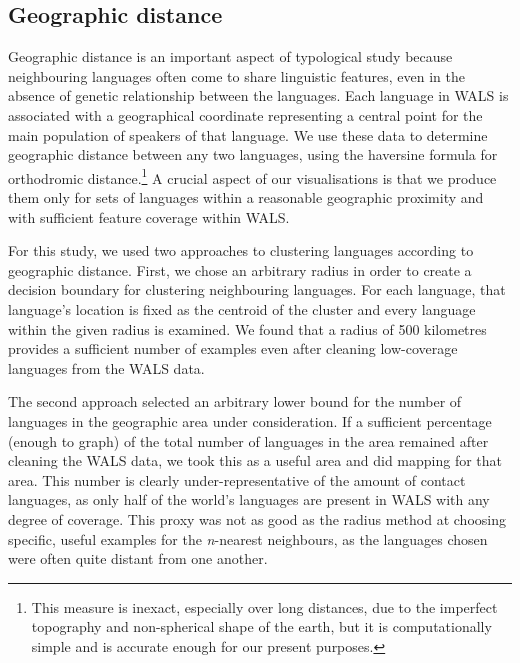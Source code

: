 \documentclass[11pt]{article}
\begin{document}
\subsection{Geographic distance}
Geographic distance is an important aspect of typological study because neighbouring  languages often come to share linguistic features, even in the absence of genetic relationship between the languages. Each language in WALS is associated with a geographical coordinate representing a central point for the main population of speakers of that language. We use these data to determine geographic distance between any two languages, using the haversine formula for orthodromic distance.\footnote{This measure is inexact, especially over long distances, due to the imperfect topography and non-spherical shape of the earth, but it is computationally simple and is accurate enough for our present purposes.}
A crucial aspect of our visualisations is that we produce them only for sets of languages within a reasonable geographic proximity and with sufficient feature coverage within WALS.

For this study, we used two approaches to clustering languages according to geographic distance. First, we chose an arbitrary radius in order to create a decision boundary for clustering neighbouring languages. For each language, that language's location is fixed as the centroid of the cluster and every language within the given radius is examined. We found that a radius of 500 kilometres provides a sufficient number of examples even after cleaning low-coverage languages from the WALS data. 

The second approach selected an arbitrary lower bound for the number of languages in the geographic area under consideration. If a sufficient percentage (enough to graph) of the total number of languages in the area remained after cleaning the WALS data, we took this as a useful area and did mapping for that area. This number is clearly under-representative of the amount of contact languages, as only half of the world's languages are present in WALS with any degree of coverage. This proxy was not as good as the radius method at choosing specific, useful examples for the \emph{n}-nearest neighbours, as the languages chosen were often quite distant from one another. 
\end{document}
